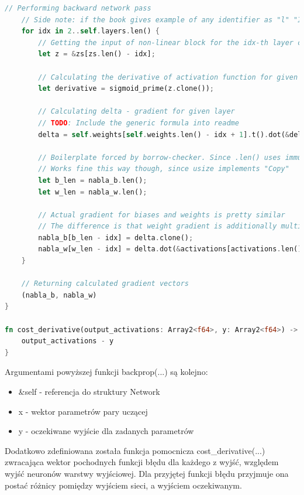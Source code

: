 \documentclass[12pt,twoside]{article}
\begin{document}
\begin{lstlisting}[language=Rust,caption=Realizacja funkcji wstecznej propagacji błędu,label={lst:backprop}]
	// Performing backward network pass
	// Side note: if the book gives example of any identifier as "l" "I" or "L" one should never follow the book and come up with anything that differs from 1
	for idx in 2..self.layers.len() {
		// Getting the input of non-linear block for the idx-th layer counting from the end
		let z = &zs[zs.len() - idx];

		// Calculating the derivative of activation function for given input
		let derivative = sigmoid_prime(z.clone());

		// Calculating delta - gradient for given layer
		// TODO: Include the generic formula into readme
		delta = self.weights[self.weights.len() - idx + 1].t().dot(&delta) * derivative;

		// Boilerplate forced by borrow-checker. Since .len() uses immutable reference, it would block the assignment operation if used inline
		// Works fine this way though, since usize implements "Copy"
		let b_len = nabla_b.len();
		let w_len = nabla_w.len();

		// Actual gradient for biases and weights is pretty similar
		// The difference is that weight gradient is additionally multiplied by the activation state of given layer
		nabla_b[b_len - idx] = delta.clone();
		nabla_w[w_len - idx] = delta.dot(&activations[activations.len() - idx - 1].t());
	}

	// Returning calculated gradient vectors
	(nabla_b, nabla_w)
}

fn cost_derivative(output_activations: Array2<f64>, y: Array2<f64>) -> Array2<f64> {
	output_activations - y
}
\end{lstlisting}

Argumentami powyższej funkcji backprop(...) są kolejno:
\begin{itemize}
	\item &self - referencja do struktury Network
	\item x - wektor parametrów pary uczącej
	\item y - oczekiwane wyjście dla zadanych parametrów
\end{itemize}
Dodatkowo zdefiniowana została funkcja pomocnicza cost\_derivative(...) zwracająca wektor pochodnych funkcji błędu dla każdego z wyjść, względem wyjść neuronów warstwy wyjściowej.
Dla przyjętej funkcji błędu przyjmuje ona postać różnicy pomiędzy wyjściem sieci, a wyjściem oczekiwanym.
\end{document}
